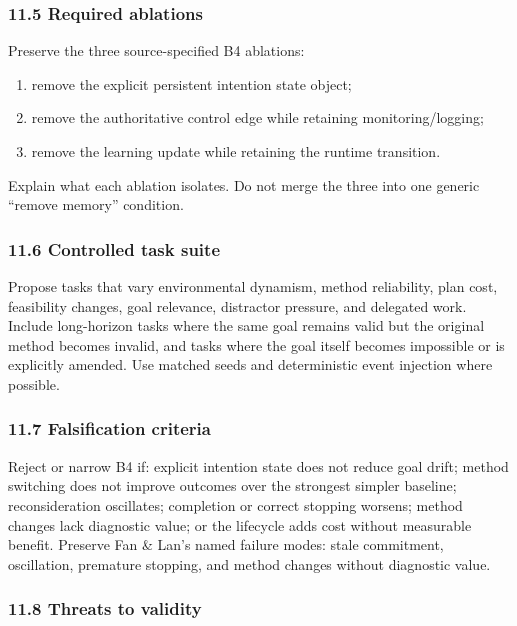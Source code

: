 \subsubsection{11.5 Required ablations}\label{required-ablations}

Preserve the three source-specified B4 ablations:

\begin{enumerate}
\def\labelenumi{\arabic{enumi}.}
\tightlist
\item
  remove the explicit persistent intention state object;
\item
  remove the authoritative control edge while retaining monitoring/logging;
\item
  remove the learning update while retaining the runtime transition.
\end{enumerate}

Explain what each ablation isolates. Do not merge the three into one generic ``remove memory'' condition.

\subsubsection{11.6 Controlled task suite}\label{controlled-task-suite}

Propose tasks that vary environmental dynamism, method reliability, plan cost, feasibility changes, goal relevance, distractor pressure, and delegated work. Include long-horizon tasks where the same goal remains valid but the original method becomes invalid, and tasks where the goal itself becomes impossible or is explicitly amended. Use matched seeds and deterministic event injection where possible.

\subsubsection{11.7 Falsification criteria}\label{falsification-criteria}

Reject or narrow B4 if: explicit intention state does not reduce goal drift; method switching does not improve outcomes over the strongest simpler baseline; reconsideration oscillates; completion or correct stopping worsens; method changes lack diagnostic value; or the lifecycle adds cost without measurable benefit. Preserve Fan \& Lan's named failure modes: stale commitment, oscillation, premature stopping, and method changes without diagnostic value.

\subsubsection{11.8 Threats to validity}\label{threats-to-validity}

